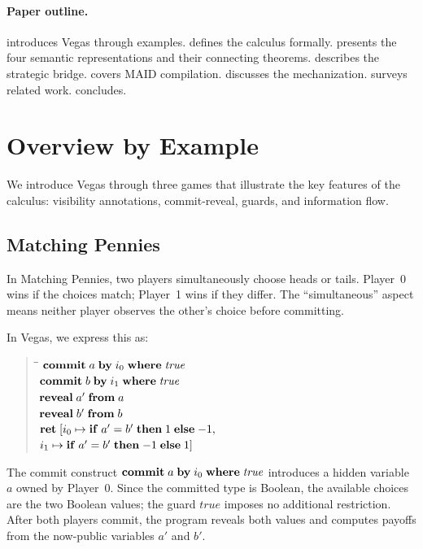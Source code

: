 \documentclass[11pt]{article}
\begin{document}
\paragraph{Paper outline.}
 introduces Vegas through examples.
 defines the calculus formally.
 presents the four semantic representations and their
connecting theorems.
 describes the strategic bridge.
 covers MAID compilation.
 discusses the mechanization.
 surveys related work.
 concludes.


\section{Overview by Example}\label{sec:overview}

We introduce Vegas through three games that illustrate the key features
of the calculus: visibility annotations, commit-reveal, guards, and
information flow.

\subsection{Matching Pennies}

In Matching Pennies, two players simultaneously choose heads or tails. Player~0
wins if the choices match; Player~1 wins if they differ. The ``simultaneous''
aspect means neither player observes the other's choice before committing.

In Vegas, we express this as:
%
\begin{quote}
\begin{tabbing}
\qquad\= \qquad\= \kill
$\mathbf{commit}\;a\;\mathbf{by}\;i_{0}\;\mathbf{where}\;\mathit{true}$ \\
$\mathbf{commit}\;b\;\mathbf{by}\;i_{1}\;\mathbf{where}\;\mathit{true}$ \\
$\mathbf{reveal}\;a'\;\mathbf{from}\;a$ \\
$\mathbf{reveal}\;b'\;\mathbf{from}\;b$ \\
$\mathbf{ret}\;[i_{0} \mapsto \mathbf{if}\;a'=b'\;\mathbf{then}\;1\;\mathbf{else}\;{-1},$ \\
\> $i_{1} \mapsto \mathbf{if}\;a'=b'\;\mathbf{then}\;{-1}\;\mathbf{else}\;1]$
\end{tabbing}
\end{quote}
%
The commit construct $\mathbf{commit}\;a\;\mathbf{by}\;i_{0}\;\mathbf{where}\;\mathit{true}$ introduces a hidden variable~$a$ owned by Player~0. Since the committed type is Boolean, the available choices are the two Boolean values; the guard $\mathit{true}$ imposes no additional restriction. After both players commit, the program reveals both values and computes payoffs from the now-public variables $a'$ and $b'$.
\end{document}
